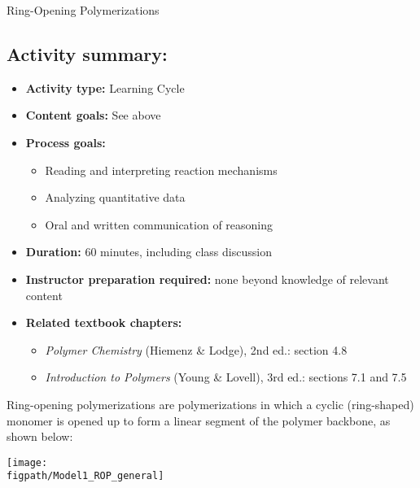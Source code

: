 \begin{activity}{Ring-Opening Polymerizations}
\begin{instructornotes}
	\subsection*{Activity summary:}
	\begin{itemize}
		\item \textbf{Activity type:} Learning Cycle
		\item \textbf{Content goals:} See above
		\item \textbf{Process goals:} %
			\begin{itemize}
				\item Reading and interpreting reaction mechanisms
				\item Analyzing quantitative data
				\item Oral and written communication of reasoning
			\end{itemize}
		\item \textbf{Duration:} 60 minutes, including class discussion
		\item \textbf{Instructor preparation required:} none beyond knowledge of relevant content
		\item \textbf{Related textbook chapters:}
			\begin{itemize}
				\item \emph{Polymer Chemistry} (Hiemenz \& Lodge), 2nd ed.: section 4.8
				\item \emph{Introduction to Polymers} (Young \& Lovell), 3rd ed.: sections 7.1 and 7.5 %
			\end{itemize}
	\end{itemize}
	
\end{instructornotes}


\begin{model}
	\label{\labelbase:mdl:ROP}

	Ring-opening polymerizations are polymerizations in which a cyclic (ring-shaped) monomer is opened up to form a linear segment of the polymer backbone, as shown below:
	
	\centerline{\texttt{[image: \\figpath/Model1\_ROP\_general]}}
	

\end{model}
\end{activity}
